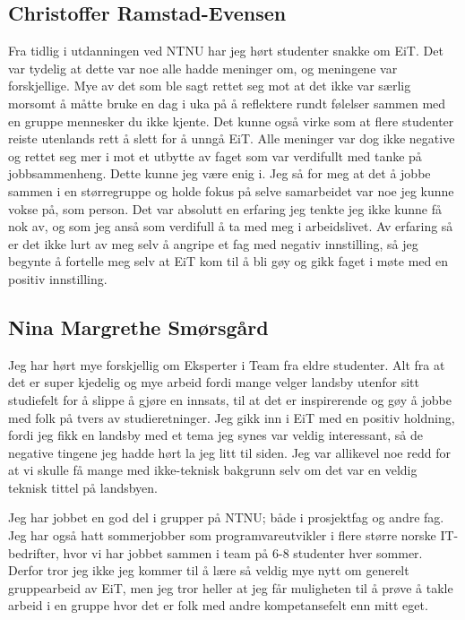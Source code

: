 \subsection*{Christoffer Ramstad-Evensen}
Fra tidlig i utdanningen ved NTNU har jeg hørt studenter snakke om EiT. Det var tydelig at dette var noe alle hadde 
meninger om, og meningene var forskjellige. Mye av det som ble sagt rettet seg mot at det ikke var særlig morsomt 
å måtte bruke en dag i uka på å reflektere rundt følelser sammen med en gruppe mennesker du ikke kjente. Det 
kunne også virke som at flere studenter reiste utenlands rett å slett for å unngå EiT. Alle meninger var dog ikke 
negative og rettet seg mer i mot et utbytte av faget som var verdifullt med tanke på jobbsammenheng. Dette kunne 
jeg være enig i. Jeg så for meg at det å jobbe sammen i en størregruppe og holde fokus på selve samarbeidet var 
noe jeg kunne vokse på, som person. Det var absolutt en erfaring jeg tenkte jeg ikke kunne få nok av, og som jeg 
anså som verdifull å ta med meg i arbeidslivet. Av erfaring så er det ikke lurt av meg selv å angripe et fag med 
negativ innstilling, så jeg begynte å fortelle meg selv at EiT kom til å bli gøy og gikk faget i møte med en positiv 
innstilling.

\subsection*{Nina Margrethe Smørsgård}
Jeg har hørt mye forskjellig om Eksperter i Team fra eldre studenter. Alt fra 
at det er super kjedelig og mye arbeid fordi mange velger landsby utenfor sitt 
studiefelt for å slippe å gjøre en innsats, til at det er inspirerende og gøy 
å jobbe med folk på tvers av studieretninger. Jeg gikk inn i EiT med en positiv 
holdning, fordi jeg fikk en landsby med et tema jeg synes var veldig 
interessant, så de negative tingene jeg hadde hørt la jeg litt til siden. Jeg 
var allikevel noe redd for at vi skulle få mange med ikke-teknisk bakgrunn selv 
om det var en veldig teknisk tittel på landsbyen.

Jeg har jobbet en god del i grupper på NTNU; både i prosjektfag og andre fag.
Jeg har også hatt sommerjobber som programvareutvikler i flere større norske IT-
bedrifter, hvor vi har jobbet sammen i team på 6-8 studenter hver sommer. 
Derfor tror jeg ikke jeg kommer til å lære så veldig mye nytt om generelt 
gruppearbeid av EiT, men jeg tror heller at jeg får muligheten til å prøve å 
takle arbeid i en gruppe hvor det er folk med andre kompetansefelt enn mitt eget.

